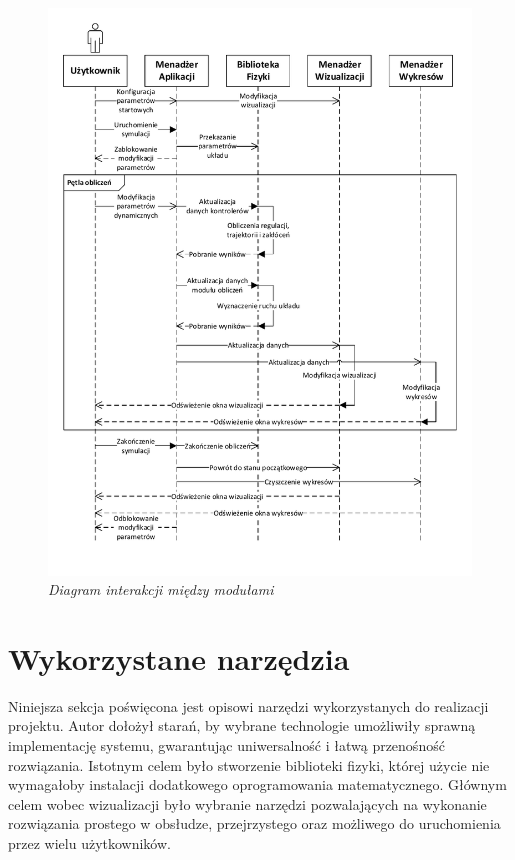 \documentclass[12pt, oneside]{report}
\theoremstyle{definition}
\begin{document}
\begin{figure}[H]
	\centering
		\includegraphics[width = 400pt]{Interaction} 
		\caption{\textit{Diagram interakcji między modułami}}
		\label{Interaction}
\end{figure}

\section{Wykorzystane narzędzia}
Niniejsza sekcja poświęcona jest opisowi narzędzi wykorzystanych do realizacji projektu. Autor dołożył starań, by wybrane technologie umożliwiły sprawną implementację systemu, gwarantując uniwersalność i łatwą przenośność rozwiązania. Istotnym  celem było stworzenie biblioteki fizyki, której użycie nie wymagałoby instalacji dodatkowego oprogramowania matematycznego. Głównym celem wobec wizualizacji było wybranie narzędzi pozwalających na wykonanie rozwiązania prostego w obsłudze, przejrzystego oraz możliwego do uruchomienia przez wielu użytkowników.
\end{document}

